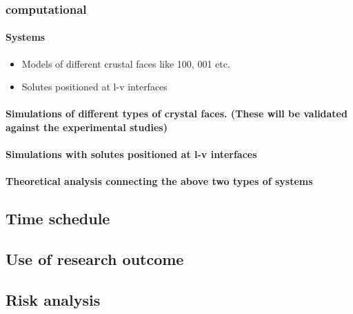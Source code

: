 \documentclass[a4paper,12pt,single,pdftex]{scrartcl}
\begin{document}
{\label{ID_872435313}\subsubsection{computational}

\label{ID_1103117492}\paragraph{Systems}

\begin{itemize}
\label{ID_190203064}\item Models of different crustal faces like 100, 001 etc.
\label{ID_808283525}\item Solutes positioned at l-v interfaces
\end{itemize}
\label{ID_190203064}\label{ID_808283525}\label{ID_1619461814}\paragraph{Simulations of different types of crystal faces. (These will be validated against the experimental studies)}

\label{ID_1547495769}\paragraph{Simulations with solutes positioned at l-v interfaces}

\label{ID_1538917616}\paragraph{Theoretical analysis connecting the above two types of systems}

\label{ID_581300306}\subsection{Time schedule}

\label{ID_1195711759}\subsection{Use of research outcome}

\label{ID_1268337594}\subsection{Risk analysis}

\label{ID_392987275}\subsection{}

}
\end{document}
